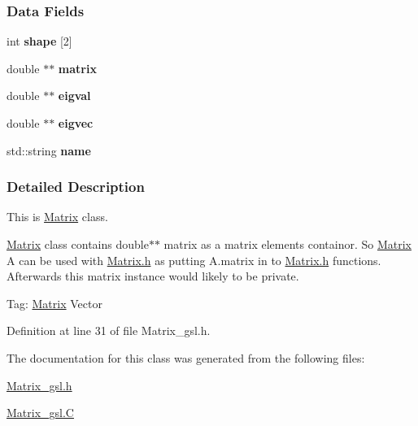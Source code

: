 \subsubsection*{Data Fields}
\begin{DoxyCompactItemize}
\item 
\mbox{\label{classMatrix_a39466a5c9a5f18d84d02f9fb7d060561}} 
int {\bfseries shape} \mbox{[}2\mbox{]}
\item 
\mbox{\label{classMatrix_a4b26a049df7108da3a46d4457afc3735}} 
double $\ast$$\ast$ {\bfseries matrix}
\item 
\mbox{\label{classMatrix_adb7fc5a84b4aa01e1417646cfc048fa8}} 
double $\ast$$\ast$ {\bfseries eigval}
\item 
\mbox{\label{classMatrix_ad12a5a14ff1acaf9862701b6f174fefb}} 
double $\ast$$\ast$ {\bfseries eigvec}
\item 
\mbox{\label{classMatrix_ab15f3c0e2ef820cc3aa6d58475b15443}} 
std\+::string {\bfseries name}
\end{DoxyCompactItemize}


\subsubsection{Detailed Description}
This is \hyperlink{classMatrix}{Matrix} class. 

\hyperlink{classMatrix}{Matrix} class contains double$\ast$$\ast$ matrix as a matrix elements containor. So \hyperlink{classMatrix}{Matrix} A can be used with \hyperlink{Matrix_8h}{Matrix.\+h} as putting A.\+matrix in to \hyperlink{Matrix_8h}{Matrix.\+h} functions. Afterwards this matrix instance would likely to be private.

Tag\+: \hyperlink{classMatrix}{Matrix} Vector 

Definition at line 31 of file Matrix\+\_\+gsl.\+h.



The documentation for this class was generated from the following files\+:\begin{DoxyCompactItemize}
\item 
\hyperlink{Matrix__gsl_8h}{Matrix\+\_\+gsl.\+h}\item 
\hyperlink{Matrix__gsl_8C}{Matrix\+\_\+gsl.\+C}\end{DoxyCompactItemize}
